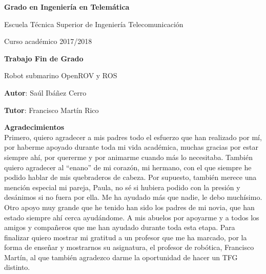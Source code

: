 \documentclass[twoside,a4paper,12pt,openany]{book}
\begin{document}
\thispagestyle{empty}

\baselineskip

\vspace{2cm}

\begin{figure}[htb]
  \centerline{}
\end{figure}

\begin{center}
  {\Large {\bf Grado en Ingeniería en Telemática}}
  \vspace{5mm}
 
  {\large {Escuela Técnica Superior de Ingeniería Telecomunicación}}
  \vspace{5mm}

  {\large {Curso académico 2017/2018}}

  \vspace{1cm}

  {\large {\bf Trabajo Fin de Grado}}

  \vspace{2cm}

  {\large {Robot submarino OpenROV y ROS\\[1cm] }}

  \vspace{5cm}
  {\bf Autor}: Saúl Ibáñez Cerro
  
  {\bf Tutor}: Francisco Martín Rico 
\end{center}

\clearpage
\newpage{\pagestyle{empty}\cleardoublepage}
\thispagestyle{empty}

\vspace{5cm}

\clearpage
\newpage{\pagestyle{empty}\cleardoublepage}
\thispagestyle{empty}

\vspace{5cm}
\textbf{\huge{Agradecimientos}}\\

Primero, quiero agradecer a mis padres todo el esfuerzo que han realizado por mí, por haberme apoyado durante toda mi vida académica, muchas gracias por estar siempre ahí, por quererme y por animarme cuando más lo necesitaba.
También quiero agradecer al ``enano'' de mi corazón, mi hermano, con el que siempre he podido hablar de mis quebraderos de cabeza.
Por supuesto, también merece una mención especial mi pareja, Paula, no sé si hubiera podido con la presión y desánimos si no fuera por ella. Me ha ayudado más que nadie, le debo muchísimo.
Otro apoyo muy grande que he tenido han sido los padres de mi novia, que han estado siempre ahí cerca ayudándome.
A mis abuelos por apoyarme y a todos los amigos y compañeros que me han ayudado durante toda esta etapa.
Para finalizar quiero mostrar mi gratitud a un profesor que me ha marcado, por la forma de enseñar y mostrarnos su asignatura, el profesor de robótica, Francisco Martín, al que también agradezco darme la oportunidad de hacer un TFG distinto.
\end{document}
